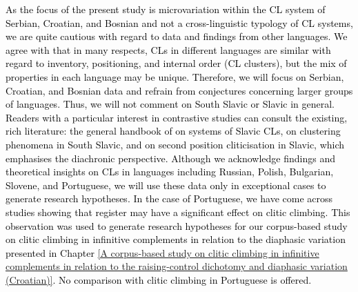 \textcolor{black}{As the focus of the present study is microvariation within the CL system of Serbian, Croatian, and Bosnian and not a cross-linguistic typology of CL systems, we are quite cautious with regard to data and findings from other languages. We agree with \citet[4]{RosenHana17} that in many respects, CLs in different languages are similar with regard to inventory, positioning, and internal order (CL clusters), but the mix of properties in each language may be unique. Therefore, we will focus on Serbian, Croatian, and Bosnian data and refrain from conjectures concerning larger groups of languages. Thus, we will not comment on South Slavic or Slavic in general. Readers with a particular interest in contrastive studies can consult the existing, rich literature: the general handbook of \citet{FranksKing00} on systems of Slavic CLs, \citet{Bozovic21} on clustering phenomena in South Slavic, and \citet{Migdalski16} on second position cliticisation in Slavic, which emphasises the diachronic perspective. Although we acknowledge findings and theoretical insights on CLs in languages including Russian, Polish, Bulgarian, Slovene, and Portuguese, we will use these data only in exceptional cases to generate research hypotheses. In the case of Portuguese, we have come across studies showing that register may have a significant effect on clitic climbing. This observation was used to generate research hypotheses for our corpus-based study on clitic climbing in infinitive complements in relation to the diaphasic variation presented in Chapter \ref{A corpus-based study on clitic climbing in infinitive complements in relation to the raising-control dichotomy and diaphasic variation (Croatian)}. No comparison with clitic climbing in Portuguese is offered. 
}
